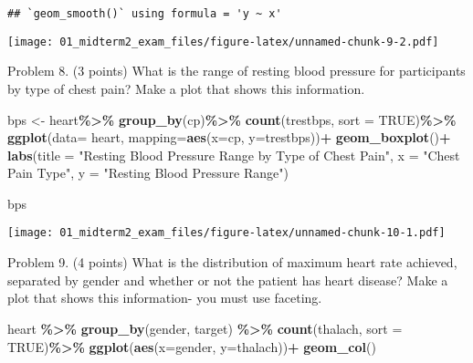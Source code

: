 \documentclass[
]{article}
\newenvironment{Shaded}{\begin{snugshade}}{\end{snugshade}}
\newcommand{\AttributeTok}[1]{\textcolor[rgb]{0.13,0.29,0.53}{#1}}
\newcommand{\ConstantTok}[1]{\textcolor[rgb]{0.56,0.35,0.01}{#1}}
\newcommand{\FunctionTok}[1]{\textcolor[rgb]{0.13,0.29,0.53}{\textbf{#1}}}
\newcommand{\NormalTok}[1]{#1}
\newcommand{\OtherTok}[1]{\textcolor[rgb]{0.56,0.35,0.01}{#1}}
\newcommand{\SpecialCharTok}[1]{\textcolor[rgb]{0.81,0.36,0.00}{\textbf{#1}}}
\newcommand{\StringTok}[1]{\textcolor[rgb]{0.31,0.60,0.02}{#1}}
\begin{document}
\begin{verbatim}
## `geom_smooth()` using formula = 'y ~ x'
\end{verbatim}

\texttt{[image: 01\_midterm2\_exam\_files/figure-latex/unnamed-chunk-9-2.pdf]}

Problem 8. (3 points) What is the range of resting blood pressure for
participants by type of chest pain? Make a plot that shows this
information.

\begin{Shaded}
\begin{Highlighting}[]
\NormalTok{bps }\OtherTok{\textless{}{-}}\NormalTok{ heart}\SpecialCharTok{\%\textgreater{}\%}
  \FunctionTok{group\_by}\NormalTok{(cp)}\SpecialCharTok{\%\textgreater{}\%}
  \FunctionTok{count}\NormalTok{(trestbps, }\AttributeTok{sort =} \ConstantTok{TRUE}\NormalTok{)}\SpecialCharTok{\%\textgreater{}\%}
  \FunctionTok{ggplot}\NormalTok{(}\AttributeTok{data=}\NormalTok{ heart, }\AttributeTok{mapping=}\FunctionTok{aes}\NormalTok{(}\AttributeTok{x=}\NormalTok{cp, }\AttributeTok{y=}\NormalTok{trestbps))}\SpecialCharTok{+}
  \FunctionTok{geom\_boxplot}\NormalTok{()}\SpecialCharTok{+}
  \FunctionTok{labs}\NormalTok{(}\AttributeTok{title =} \StringTok{"Resting Blood Pressure Range by Type of Chest Pain"}\NormalTok{, }\AttributeTok{x =} \StringTok{"Chest Pain Type"}\NormalTok{, }\AttributeTok{y =} \StringTok{"Resting Blood Pressure Range"}\NormalTok{)}

\NormalTok{bps}
\end{Highlighting}
\end{Shaded}

\texttt{[image: 01\_midterm2\_exam\_files/figure-latex/unnamed-chunk-10-1.pdf]}

Problem 9. (4 points) What is the distribution of maximum heart rate
achieved, separated by gender and whether or not the patient has heart
disease? Make a plot that shows this information- you must use faceting.

\begin{Shaded}
\begin{Highlighting}[]
\NormalTok{heart }\SpecialCharTok{\%\textgreater{}\%}
  \FunctionTok{group\_by}\NormalTok{(gender, target) }\SpecialCharTok{\%\textgreater{}\%}
  \FunctionTok{count}\NormalTok{(thalach, }\AttributeTok{sort =} \ConstantTok{TRUE}\NormalTok{)}\SpecialCharTok{\%\textgreater{}\%}
    \FunctionTok{ggplot}\NormalTok{(}\FunctionTok{aes}\NormalTok{(}\AttributeTok{x=}\NormalTok{gender, }\AttributeTok{y=}\NormalTok{thalach))}\SpecialCharTok{+}
    \FunctionTok{geom\_col}\NormalTok{()}
\end{Highlighting}
\end{Shaded}
\end{document}
